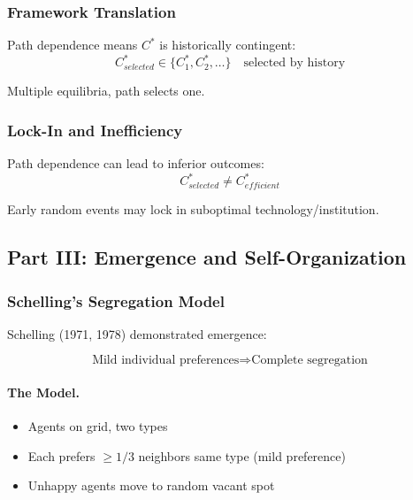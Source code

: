 \subsubsection{Framework Translation}

Path dependence means $C^*$ is historically contingent:
\begin{equation}
C^*_{selected} \in \{C^*_1, C^*_2, \ldots\} \quad \text{selected by history}
\end{equation}

Multiple equilibria, path selects one.

\subsubsection{Lock-In and Inefficiency}

Path dependence can lead to inferior outcomes:
\begin{equation}
C^*_{selected} \neq C^*_{efficient}
\end{equation}

Early random events may lock in suboptimal technology/institution.

\subsection{Part III: Emergence and Self-Organization}

\subsubsection{Schelling's Segregation Model}

Schelling (1971, 1978) demonstrated emergence:

\begin{equation}
\boxed{
\text{Mild individual preferences} \Rightarrow \text{Complete segregation}
}
\label{eq:schelling}
\end{equation}

\paragraph{The Model.}
\begin{itemize}
    \item Agents on grid, two types
    \item Each prefers $\geq 1/3$ neighbors same type (mild preference)
    \item Unhappy agents move to random vacant spot
\end{itemize}

